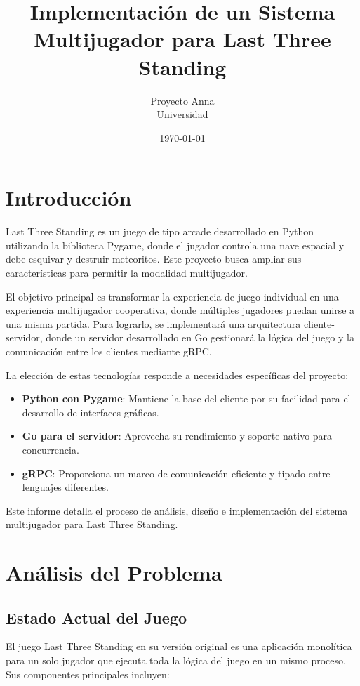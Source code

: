 \documentclass[11pt,letterpaper]{article}
\title{\textbf{Implementación de un Sistema Multijugador para Last Three Standing}}
\author{Proyecto Anna \\ Universidad}
\date{\today}
\begin{document}
\maketitle

\tableofcontents
\newpage

\section{Introducción}

Last Three Standing es un juego de tipo arcade desarrollado en Python utilizando la biblioteca Pygame, donde el jugador controla una nave espacial y debe esquivar y destruir meteoritos. Este proyecto busca ampliar sus características para permitir la modalidad multijugador.

El objetivo principal es transformar la experiencia de juego individual en una experiencia multijugador cooperativa, donde múltiples jugadores puedan unirse a una misma partida. Para lograrlo, se implementará una arquitectura cliente-servidor, donde un servidor desarrollado en Go gestionará la lógica del juego y la comunicación entre los clientes mediante gRPC.

La elección de estas tecnologías responde a necesidades específicas del proyecto:

\begin{itemize}
    \item \textbf{Python con Pygame}: Mantiene la base del cliente por su facilidad para el desarrollo de interfaces gráficas.
    \item \textbf{Go para el servidor}: Aprovecha su rendimiento y soporte nativo para concurrencia.
    \item \textbf{gRPC}: Proporciona un marco de comunicación eficiente y tipado entre lenguajes diferentes.
\end{itemize}

Este informe detalla el proceso de análisis, diseño e implementación del sistema multijugador para Last Three Standing.

\section{Análisis del Problema}

\subsection{Estado Actual del Juego}

El juego Last Three Standing en su versión original es una aplicación monolítica para un solo jugador que ejecuta toda la lógica del juego en un mismo proceso. Sus componentes principales incluyen:
\end{document}
